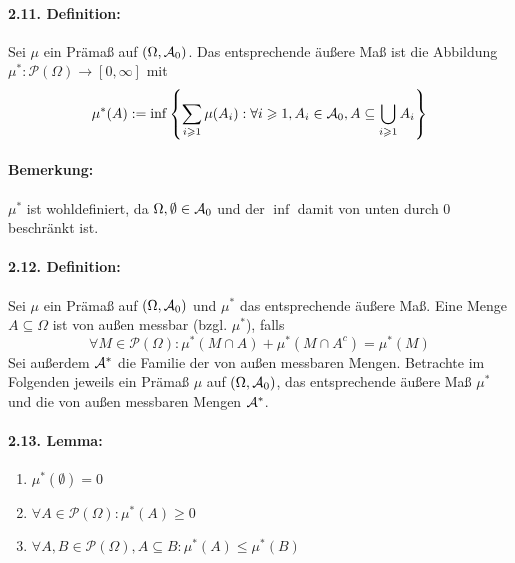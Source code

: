 \paragraph{2.11. Definition:}Sei $\mu$ ein Pr\"ama\ss{} auf $(\Omega,\mathcal{A}_0)$. Das entsprechende \"au\ss{}ere Ma\ss{} ist die Abbildung $\mu^*:\mathcal{P}(\Omega)\to[0,\infty]$ mit 
$$\mu^*(A):=\inf\left\{\sum_{i\geqslant1}\mu(A_i):\forall i\geqslant1,A_i\in\mathcal{A}_0, A\subseteq\bigcup_{i\geqslant1}A_i\right\}$$

\paragraph{Bemerkung:}$\mu^*$ ist wohldefiniert, da $\Omega,\emptyset\in\mathcal{A}_0$ und der $\inf$ damit von unten durch $0$ beschr\"ankt ist. 

\paragraph{2.12. Definition:}Sei $\mu$ ein Pr\"ama\ss{} auf $(\Omega,\mathcal{A}_0)$ und $\mu^*$ das entsprechende \"au\ss{}ere Ma\ss{}. Eine Menge $A\subseteq\Omega$ ist von au\ss{}en messbar (bzgl. $\mu^*$), falls
$$\forall M\in\mathcal{P}(\Omega):\mu^*(M\cap A)+\mu^*(M\cap A^c)=\mu^*(M)$$
Sei au\ss{}erdem $\mathcal{A}^*$ die Familie der von au\ss{}en messbaren Mengen.\newline \newline
Betrachte im Folgenden jeweils ein Pr\"ama\ss{} $\mu$ auf $(\Omega,\mathcal{A}_0)$, das entsprechende \"au\ss{}ere Ma\ss{} $\mu^*$ und die von au\ss{}en messbaren Mengen $\mathcal{A}^*$.

\paragraph{2.13. Lemma:}
\begin{enumerate}[label=(\roman*)]
    \item $\mu^*(\emptyset)=0$
    \item $\forall A\in\mathcal{P}(\Omega):\mu^*(A)\geq0$
    \item $\forall A,B\in\mathcal{P}(\Omega),A\subseteq B:\mu^*(A)\leq\mu^*(B)$
\end{enumerate}

